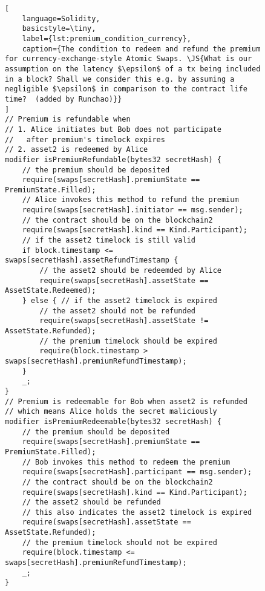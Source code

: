 \begin{figure}[htb]
\begin{lstlisting}[
    language=Solidity, 
    basicstyle=\tiny,
    label={lst:premium_condition_currency},
    caption={The condition to redeem and refund the premium for currency-exchange-style Atomic Swaps. \JS{What is our assumption on the latency $\epsilon$ of a tx being included in a block? Shall we consider this e.g. by assuming a negligible $\epsilon$ in comparison to the contract life time?  (added by Runchao)}}
]
// Premium is refundable when
// 1. Alice initiates but Bob does not participate
//   after premium's timelock expires
// 2. asset2 is redeemed by Alice
modifier isPremiumRefundable(bytes32 secretHash) {
    // the premium should be deposited
    require(swaps[secretHash].premiumState == PremiumState.Filled);
    // Alice invokes this method to refund the premium
    require(swaps[secretHash].initiator == msg.sender);
    // the contract should be on the blockchain2
    require(swaps[secretHash].kind == Kind.Participant);
    // if the asset2 timelock is still valid
    if block.timestamp <= swaps[secretHash].assetRefundTimestamp {
        // the asset2 should be redeemded by Alice
        require(swaps[secretHash].assetState == AssetState.Redeemed);
    } else { // if the asset2 timelock is expired
        // the asset2 should not be refunded
        require(swaps[secretHash].assetState != AssetState.Refunded);
        // the premium timelock should be expired
        require(block.timestamp > swaps[secretHash].premiumRefundTimestamp);
    }
    _;
}
// Premium is redeemable for Bob when asset2 is refunded
// which means Alice holds the secret maliciously
modifier isPremiumRedeemable(bytes32 secretHash) {
    // the premium should be deposited
    require(swaps[secretHash].premiumState == PremiumState.Filled);
    // Bob invokes this method to redeem the premium
    require(swaps[secretHash].participant == msg.sender);
    // the contract should be on the blockchain2
    require(swaps[secretHash].kind == Kind.Participant);
    // the asset2 should be refunded
    // this also indicates the asset2 timelock is expired
    require(swaps[secretHash].assetState == AssetState.Refunded);
    // the premium timelock should not be expired
    require(block.timestamp <= swaps[secretHash].premiumRefundTimestamp);
    _;
}
\end{lstlisting}
\end{figure}

